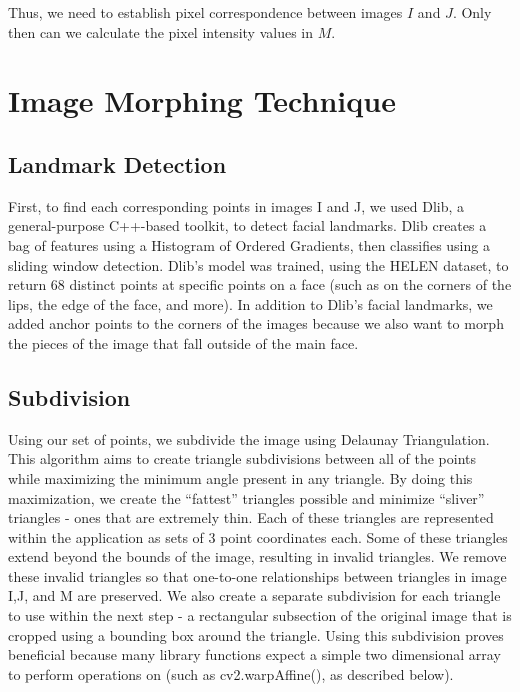 \documentclass[journal]{IEEEtran}
\begin{document}
Thus, we need to establish pixel correspondence between images $I$ and $J$. Only then can we calculate the pixel intensity values in $M$. 




\section{Image Morphing Technique}
\subsection{Landmark Detection}
	First, to find each corresponding points in images I and J, we used Dlib, a general-purpose C++-based toolkit, to detect facial landmarks. Dlib creates a bag of features using a Histogram of Ordered Gradients, then classifies using a sliding window detection. Dlib’s model was trained, using the HELEN dataset, to return 68 distinct points at specific points on a face (such as on the corners of the lips, the edge of the face, and more). In addition to Dlib's facial landmarks, we added anchor points to the corners of the images because we also want to morph the pieces of the image that fall outside of the main face.

\subsection{Subdivision}
Using our set of points, we subdivide the image using Delaunay Triangulation. This algorithm aims to create triangle subdivisions between all of the points while maximizing the minimum angle present in any triangle. By doing this maximization, we create the “fattest” triangles possible and minimize “sliver” triangles - ones that are extremely thin. Each of these triangles are represented within the application as sets of 3 point coordinates each. Some of these triangles extend beyond the bounds of the image, resulting in invalid triangles. We remove these invalid triangles so that one-to-one relationships between triangles in image I,J, and M are preserved.
We also create a separate subdivision for each triangle to use within the next step - a rectangular subsection of the original image that is cropped using a bounding box around the triangle. Using this subdivision proves beneficial because many library functions expect a simple two dimensional array to perform operations on (such as cv2.warpAffine(), as described below).
\end{document}
